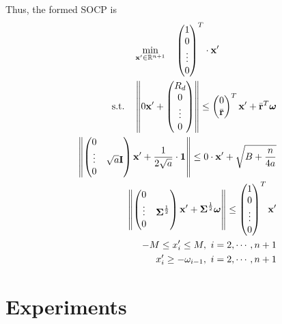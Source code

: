 \documentclass[12pt]{ftec2101}
\newcommand{\matr}[1]{\mathbf{#1}}
\newcommand{\vect}[1]{\mathbf{#1}}
\begin{document}
Thus, the formed SOCP is 
\begin{gather}
    \min_{\vect{x'} \in \mathbb{R}^{n+1}} \quad \begin{pmatrix}
        1 \\
        0 \\
        \vdots \\
        0
    \end{pmatrix}^T
    \cdot \vect{x'}\\
    \begin{aligned}
    \textup{s.t.} \quad  \left \Vert 0 \vect{x'} + 
    \begin{pmatrix}
        R_d\\
        0\\
        \vdots\\
        0
    \end{pmatrix} \right \Vert \leq
    \begin{pmatrix}
        0\\
        \bar{\vect{r}}
    \end{pmatrix}^T \vect{x'} + \bar{\vect{r}}^T \boldsymbol{\omega}\\
    \left \Vert 
    \begin{pmatrix}
        0 & \\
        \vdots & \sqrt{a} \matr{I} \\
        0 & 
    \end{pmatrix}\vect{x'} + \frac{1}{2\sqrt{a}} \cdot \vect{1} \right \Vert \leq 0 \cdot \vect{x'} + \sqrt{B+\frac{n}{4a}}\\
    \left \Vert
    \begin{pmatrix}
        0 & \\
        \vdots & \boldsymbol{\Sigma}^{\frac{1}{2}}\\
        0 & 
    \end{pmatrix} \vect{x'} + \boldsymbol{\Sigma}^{\frac{1}{2}} \boldsymbol{\omega} \right \Vert \leq
    \begin{pmatrix}
        1 \\
        0 \\
        \vdots \\
        0
    \end{pmatrix}^T \vect{x'}\\
    -M \leq x'_i \leq M,\ i=2,\cdots,n+1 \\
    x'_i \geq - \omega_{i - 1},\ i=2,\cdots,n+1
    \end{aligned}
\end{gather}
\section{Experiments}
\end{document}
